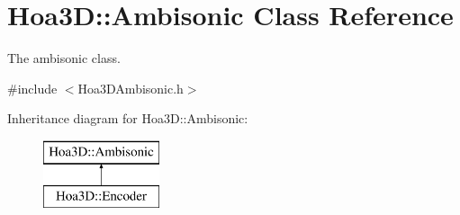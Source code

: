 \hypertarget{class_hoa3_d_1_1_ambisonic}{\section{Hoa3\-D\-:\-:Ambisonic Class Reference}
\label{class_hoa3_d_1_1_ambisonic}
}


The ambisonic class.  




{\ttfamily \#include $<$Hoa3\-D\-Ambisonic.\-h$>$}

Inheritance diagram for Hoa3\-D\-:\-:Ambisonic\-:\begin{figure}[H]
\begin{center}
\leavevmode
\includegraphics[height=2.000000cm]{class_hoa3_d_1_1_ambisonic}
\end{center}
\end{figure}
